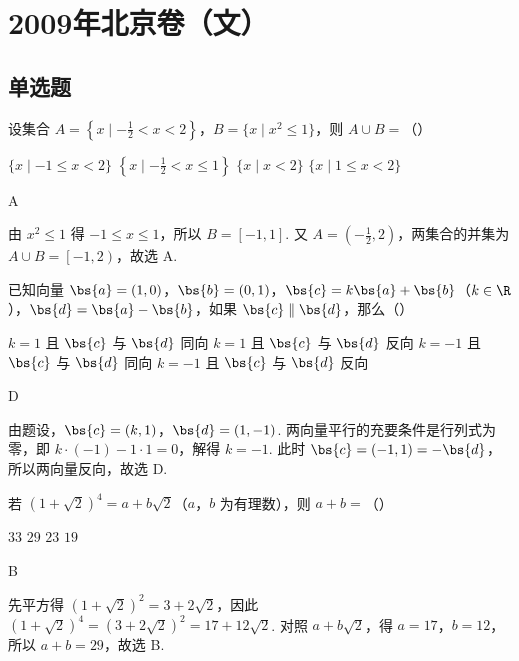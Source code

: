 \chapter{2009年北京卷（文）}

\section{单选题}

\begin{problem}
设集合 \(A = \left\{x \mid -\frac{1}{2} < x < 2\right\}\)，\(B = \{x \mid x^2 \leqslant 1\}\)，则 \(A \cup B =\)（\quad）

\choices
    {\(\{x\mid -1\leqslant x < 2\}\)}
    {\(\left\{x\mid -\frac{1}{2} < x\leqslant 1\right\}\)}
    {\( \{x \mid x < 2\} \)}
    {\(\{x\mid 1\leqslant x < 2\}\)}
\begin{answer}
A
\end{answer}

\begin{solution}
由 \(x^2\leqslant 1\) 得 \(-1\leqslant x\leqslant 1\)，所以 \(B=\left[-1,1\right]\). 又 \(A=\left(-\frac{1}{2},2\right)\)，两集合的并集为 \(A\cup B=\left[-1,2\right)\)，故选 A.
\end{solution}
\end{problem}

\begin{problem}
已知向量 \(\bs{a} = (1,0)\)，\(\bs{b} = (0,1)\)，\(\bs{c} = k\bs{a} + \bs{b}\)（\(k \in \R\)），\(\bs{d} = \bs{a} - \bs{b}\)，如果 \(\bs{c} \parallel \bs{d}\)，那么（\quad）

\choices
    {\(k = 1\) 且 \(\bs{c}\) 与 \(\bs{d}\) 同向}
    {\(k = 1\) 且 \(\bs{c}\) 与 \(\bs{d}\) 反向}
    {\(k = -1\) 且 \(\bs{c}\) 与 \(\bs{d}\) 同向}
    {\(k = -1\) 且 \(\bs{c}\) 与 \(\bs{d}\) 反向}
\begin{answer}
D
\end{answer}

\begin{solution}
由题设，\(\bs{c}=(k,1)\)，\(\bs{d}=(1,-1)\). 两向量平行的充要条件是行列式为零，即 \(k\cdot(-1)-1\cdot1=0\)，解得 \(k=-1\). 此时 \(\bs{c}=(-1,1)=-\bs{d}\)，所以两向量反向，故选 D.
\end{solution}
\end{problem}

\begin{problem}
若 \((1 + \sqrt{2})^4 = a + b\sqrt{2}\)（\(a\)，\(b\) 为有理数），则 \(a + b =\)（\quad）

\choices
    {\(33\)}
    {\(29\)}
    {\(23\)}
    {\(19\)}
\begin{answer}
B
\end{answer}

\begin{solution}
先平方得 \(\left(1+\sqrt{2}\right)^2=3+2\sqrt{2}\)，因此 \(\left(1+\sqrt{2}\right)^4=\left(3+2\sqrt{2}\right)^2=17+12\sqrt{2}\). 对照 \(a+b\sqrt{2}\)，得 \(a=17\)，\(b=12\)，所以 \(a+b=29\)，故选 B.
\end{solution}
\end{problem}

